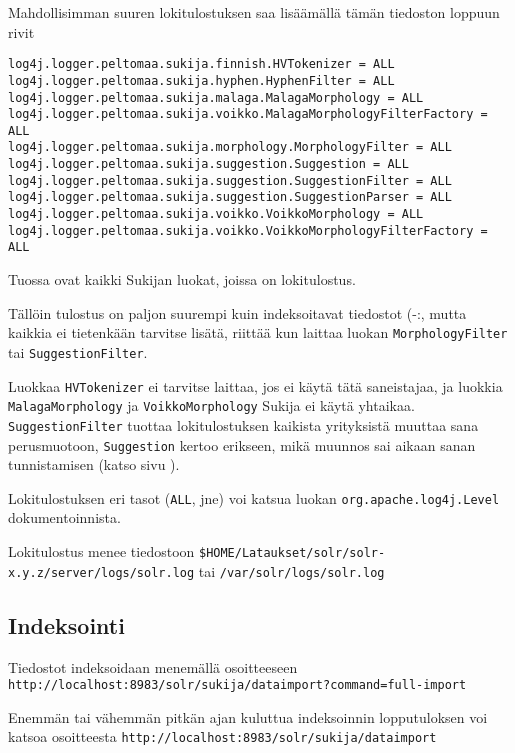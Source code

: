 \documentclass[12pt]{article}
\begin{document}
Mahdollisimman suuren lokitulostuksen saa lisäämällä tämän tiedoston
loppuun rivit


{\footnotesize
\begin{verbatim}
log4j.logger.peltomaa.sukija.finnish.HVTokenizer = ALL
log4j.logger.peltomaa.sukija.hyphen.HyphenFilter = ALL
log4j.logger.peltomaa.sukija.malaga.MalagaMorphology = ALL
log4j.logger.peltomaa.sukija.voikko.MalagaMorphologyFilterFactory = ALL
log4j.logger.peltomaa.sukija.morphology.MorphologyFilter = ALL
log4j.logger.peltomaa.sukija.suggestion.Suggestion = ALL
log4j.logger.peltomaa.sukija.suggestion.SuggestionFilter = ALL
log4j.logger.peltomaa.sukija.suggestion.SuggestionParser = ALL
log4j.logger.peltomaa.sukija.voikko.VoikkoMorphology = ALL
log4j.logger.peltomaa.sukija.voikko.VoikkoMorphologyFilterFactory = ALL
\end{verbatim}
}

Tuossa ovat kaikki Sukijan luokat, joissa on lokitulostus.

Tällöin tulostus on paljon suurempi kuin indeksoitavat tiedostot (-:,
mutta kaikkia ei tietenkään tarvitse lisätä, riittää kun laittaa
luokan \verb=MorphologyFilter= tai \verb=SuggestionFilter=.

Luokkaa \verb=HVTokenizer= ei tarvitse laittaa, jos ei käytä tätä
saneistajaa, ja luokkia
\verb=MalagaMorphology= ja \verb=VoikkoMorphology= Sukija ei käytä
yhtaikaa. \verb=SuggestionFilter= tuottaa lokitulostuksen kaikista
yrityksistä muuttaa sana perusmuotoon, \verb=Suggestion= kertoo
erikseen, mikä muunnos sai aikaan sanan tunnistamisen (katso sivu
).

Lokitulostuksen eri tasot (\verb=ALL=, jne) voi katsua luokan
\verb=org.apache.log4j.Level= dokumentoinnista.

Lokitulostus menee tiedostoon
\verb=$HOME/Lataukset/solr/solr-x.y.z/server/logs/solr.log= tai
\verb=/var/solr/logs/solr.log=


\subsection*{Indeksointi}

Tiedostot indeksoidaan menemällä osoitteeseen
\verb|http://localhost:8983/solr/sukija/dataimport?command=full-import|

Enemmän tai vähemmän pitkän ajan kuluttua indeksoinnin lopputuloksen
voi katsoa osoitteesta
\verb|http://localhost:8983/solr/sukija/dataimport|
\end{document}
